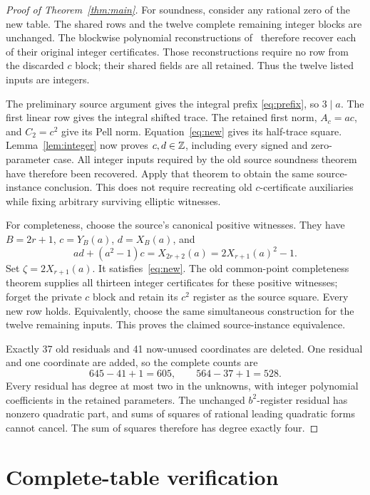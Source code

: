 \documentclass[10pt]{article}
\begin{document}
\begin{proof}[Proof of Theorem~\ref{thm:main}]
For soundness, consider any rational zero of the new table. The
shared rows and the twelve complete remaining integer blocks are
unchanged. The blockwise polynomial reconstructions of~\cite{scaled}
therefore recover each of their original integer certificates. Those
reconstructions require no row from the discarded \(c\) block;
their shared fields are all retained. Thus the twelve listed inputs
are integers.

The preliminary source argument gives the integral prefix
\eqref{eq:prefix}, so \(3\mid a\). The first linear row gives
the integral shifted trace. The retained first norm, \(A_c=ac\),
and \(C_2=c^2\) give its Pell norm. Equation~\eqref{eq:new}
gives its half-trace square. Lemma~\ref{lem:integer} now proves
\(c,d\in\mathbb Z\), including every signed and zero-parameter case.
All integer inputs required by the old source soundness theorem have
therefore been recovered. Apply that theorem to obtain the same
source-instance conclusion. This does not require recreating old
\(c\)-certificate auxiliaries while fixing arbitrary surviving
elliptic witnesses.

For completeness, choose the source's canonical positive witnesses.
They have \(B=2r+1\), \(c=Y_B(a)\), \(d=X_B(a)\), and
\[
 ad+(a^2-1)c=X_{2r+2}(a)=2X_{r+1}(a)^2-1.
\]
Set \(\zeta=2X_{r+1}(a)\). It satisfies~\eqref{eq:new}.
The old common-point completeness theorem supplies all thirteen
integer certificates for these positive witnesses; forget the private
\(c\) block and retain its \(c^2\) register as the source square.
Every new row holds. Equivalently, choose the same simultaneous
construction for the twelve remaining inputs. This proves the
claimed source-instance equivalence.

Exactly 37 old residuals and 41 now-unused coordinates are deleted.
One residual and one coordinate are added, so the complete counts are
\[
                    645-41+1=605,\qquad
                    564-37+1=528.
\]
Every residual has degree at most two in the unknowns, with integer
polynomial coefficients in the retained parameters. The unchanged
\(b^2\)-register residual has nonzero quadratic part, and sums of
squares of rational leading quadratic forms cannot cancel. The sum
of squares therefore has degree exactly four.
\end{proof}

\section{Complete-table verification}
\end{document}
